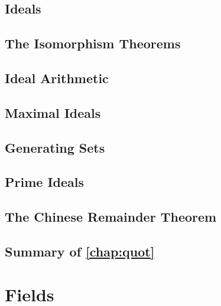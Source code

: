 \documentclass{memoir}
\begin{document}
    \section{Ideals}
      \label{sec:ideals}
      
      \newpage

    \section{The Isomorphism Theorems}
      \label{sec:iso-thms}
      
      \newpage

    \section{Ideal Arithmetic}
      \label{sec:ideal-lattice}
      
      \newpage

    \section{Maximal Ideals}
      \label{sec:max-ideals}
      
      \newpage

    \section{Generating Sets}
      \label{sec:gen-sets}
      
      \newpage

    \section{Prime Ideals}
      \newpage

    \section{The Chinese Remainder Theorem}
      \newpage

    \section*{Summary of \autoref{chap:quot}}
      

  \chapter{Fields}
\end{document}
